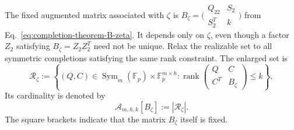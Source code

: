 \documentclass[11pt]{article}
\newcommand{\F}{\mathbb F}
\newcommand{\Sym}{\operatorname{Sym}}
\newcommand{\rank}{\operatorname{rank}}
\newcommand{\1}{\mathbf 1}
\theoremstyle{plain}
\theoremstyle{definition}
\theoremstyle{remark}
\begin{document}
The fixed augmented matrix associated with $\zeta$ is
$B_{\zeta}=\bigl(\begin{smallmatrix}Q_{22}&S_2\\S_2^T&k\end{smallmatrix}\bigr)$
from Eq.~\eqref{eq:completion-theorem-B-zeta}.  It depends only on $\zeta$,
even though a factor $Z_2$ satisfying $B_{\zeta}=Z_2Z_2^T$ need not be unique.
Relax the realizable set to all symmetric completions satisfying the same rank
constraint.  The enlarged set is
\begin{equation}
 \mathcal R_{\zeta}
 :=\left\{(Q,C)\in\Sym_m(\F_p)\times\F_p^{m\times h}:
 \rank\begin{pmatrix}Q&C\\C^T&B_{\zeta}\end{pmatrix}\le k\right\},
 \label{eq:enlarged-low-rank-completion-set}
\end{equation}
Its cardinality is denoted by
\begin{equation}
 \mathcal A_{m,h,k}[B_{\zeta}]
 :=|\mathcal R_{\zeta}|.
 \label{eq:A-completion-definition}
\end{equation}
The square brackets indicate that the matrix $B_{\zeta}$ itself is fixed.
\end{document}
